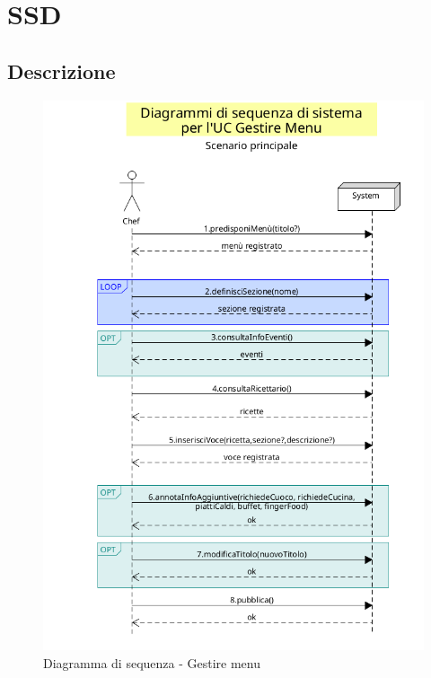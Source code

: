 \section{SSD}
\label{sec:ssd}
\subsection{Descrizione}
\label{sec:ssd-descrizione}
\begin{figure}[htbp]
\centering
\includegraphics{img/ssd-gestireMenu.png}
\caption{Diagramma di sequenza - Gestire menu}
\end{figure}


